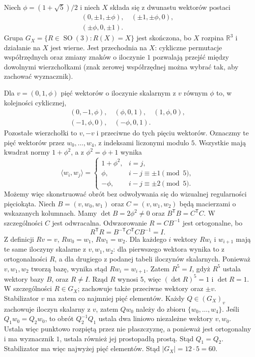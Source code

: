 \begin{przyklad}[Dwudziestościan]
\label{aa:prz:pgl2-icosahedron}
Niech $\phi=(1+\sqrt5)/2$ i niech $X$ składa się
z dwunastu wektorów postaci
\[
 \begin{gathered}
 (0,\pm1,\pm\phi),\quad(\pm1,\pm\phi,0),\\
 (\pm\phi,0,\pm1).
 \end{gathered}
\]
Grupa $G_X=\{R\in\operatorname{SO}(3):R(X)=X\}$
jest skończona, bo $X$ rozpina $\mathbb R^3$ i działanie
na $X$ jest wierne. Jest przechodnia na $X$:
cykliczne permutacje współrzędnych oraz zmiany znaków
o iloczynie $1$ pozwalają przejść między dowolnymi
wierzchołkami (znak zerowej współrzędnej można wybrać
tak, aby zachować wyznacznik).

Dla $v=(0,1,\phi)$ pięć wektorów o iloczynie skalarnym
z $v$ równym $\phi$ to, w kolejności cyklicznej,
\[
 \begin{gathered}
 (0,-1,\phi),\quad(\phi,0,1),\quad(1,\phi,0),\\
 (-1,\phi,0),\quad(-\phi,0,1).
 \end{gathered}
\]
Pozostałe wierzchołki to $v,-v$ i przeciwne do tych
pięciu wektorów. Oznaczmy te pięć wektorów przez $w_0,\ldots,w_4$,
z indeksami liczonymi modulo $5$. Wszystkie mają
kwadrat normy $1+\phi^2$, a z $\phi^2=\phi+1$ wynika
\[
 \langle w_i,w_j\rangle=
 \begin{cases}
  1+\phi^2,& i=j,\\
  \phi,& i-j\equiv\pm1\pmod 5,\\
  -\phi,& i-j\equiv\pm2\pmod 5.
 \end{cases}
\]
Możemy więc skonstruować obrót bez odwoływania się
do wizualnej regularności pięciokąta.
Niech $B=(v,w_0,w_1)$ oraz $C=(v,w_1,w_2)$ będą
macierzami o wskazanych kolumnach. Mamy
$\det B=2\phi^2\ne0$ oraz $B^{\mathsf T}B=C^{\mathsf T}C$.
W szczególności $C$ jest odwracalna. Odwzorowanie
$R=CB^{-1}$ jest ortogonalne, bo
\[
 R^{\mathsf T}R
 =B^{-\mathsf T}C^{\mathsf T}CB^{-1}=I .
\]
Z definicji $Rv=v$, $Rw_0=w_1$, $Rw_1=w_2$.
Dla każdego $i$ wektory $Rw_i$ i $w_{i+1}$ mają
te same iloczyny skalarne z $v,w_1,w_2$:
dla pierwszego wektora wynika to z ortogonalności $R$,
a dla drugiego z podanej tabeli iloczynów skalarnych.
Ponieważ $v,w_1,w_2$ tworzą bazę, wynika stąd
$Rw_i=w_{i+1}$. Zatem $R^5=I$, gdyż $R^5$ ustala
wektory bazy $B$, oraz $R\ne I$.
Rząd $R$ wynosi $5$, więc $(\det R)^5=1$ i $\det R=1$.
W szczególności $R\in G_X$; zachowuje także przeciwne
wektory oraz $\pm v$. Stabilizator $v$ ma zatem
co najmniej pięć elementów. Każdy $Q\in (G_X)_v$
zachowuje iloczyn skalarny z $v$, zatem $Qw_0$
należy do zbioru $\{w_0,\ldots,w_4\}$.
Jeśli $Q_1w_0=Q_2w_0$, to obrót $Q_2^{-1}Q_1$
ustala dwa liniowo niezależne wektory $v,w_0$.
Ustala więc punktowo rozpiętą przez nie płaszczyznę,
a ponieważ jest ortogonalny i ma wyznacznik $1$,
ustala również jej prostopadłą prostą.
Stąd $Q_1=Q_2$. Stabilizator ma więc najwyżej
pięć elementów.
Stąd $|G_X|=12\cdot5=60$.


\end{przyklad}
